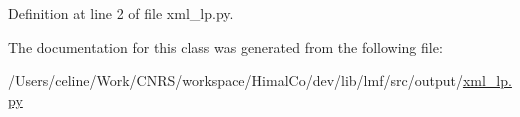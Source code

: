 Definition at line 2 of file xml\+\_\+lp.\+py.



The documentation for this class was generated from the following file\+:\begin{DoxyCompactItemize}
\item 
/\+Users/celine/\+Work/\+C\+N\+R\+S/workspace/\+Himal\+Co/dev/lib/lmf/src/output/\hyperlink{xml__lp_8py}{xml\+\_\+lp.\+py}\end{DoxyCompactItemize}
